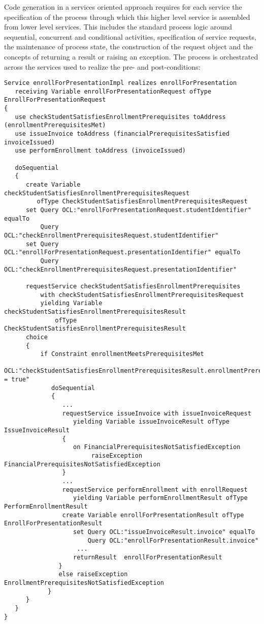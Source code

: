 Code generation in a services oriented approach requires for each service the specification of the process through which this higher level service is assembled from lower level services. This includes the standard process logic around sequential, concurrent and conditional activities, specification of service requests, the maintenance of process state, the construction of the request object and the concepts of returning a result or raising an exception. The process is orchestrated across the services used to realize the pre- and post-conditions:
\tiny{\begin{verbatim}
Service enrollForPresentationImpl realizes enrollForPresentation 
   receiving Variable enrollForPresentationRequest ofType EnrollForPresentationRequest
{
   use checkStudentSatisfiesEnrollmentPrerequisites toAddress (enrollmentPrerequisitesMet)
   use issueInvoice toAddress (financialPrerequisitesSatisfied invoiceIssued) 
   use performEnrollment toAddress (invoiceIssued)
   
   doSequential
   {
      create Variable checkStudentSatisfiesEnrollmentPrerequisitesRequest 
         ofType CheckStudentSatisfiesEnrollmentPrerequisitesRequest               
      set Query OCL:"enrollForPresentationRequest.studentIdentifier" equalTo 
          Query OCL:"checkEnrollmentPrerequisitesRequest.studentIdentifier"
      set Query OCL:"enrollForPresentationRequest.presentationIdentifier" equalTo
          Query OCL:"checkEnrollmentPrerequisitesRequest.presentationIdentifier"
                     
      requestService checkStudentSatisfiesEnrollmentPrerequisites 
          with checkStudentSatisfiesEnrollmentPrerequisitesRequest 
          yielding Variable checkStudentSatisfiesEnrollmentPrerequisitesResult
              ofType CheckStudentSatisfiesEnrollmentPrerequisitesResult
      choice
      {
          if Constraint enrollmentMeetsPrerequisitesMet 
                OCL:"checkStudentSatisfiesEnrollmentPrerequisitesResult.enrollmentPrerequisitesMet = true"
             doSequential
             {
                ...
                requestService issueInvoice with issueInvoiceRequest 
                   yielding Variable issueInvoiceResult ofType IssueInvoiceResult
                {
                   on FinancialPrerequisitesNotSatisfiedException 
                        raiseException FinancialPrerequisitesNotSatisfiedException
                }
				...
                requestService performEnrollment with enrollRequest 
                   yielding Variable performEnrollmentResult ofType PerformEnrollmentResult
                create Variable enrollForPresentationResult ofType EnrollForPresentationResult
                   set Query OCL:"issueInvoiceResult.invoice" equalTo
                       Query OCL:"enrollForPresentationResult.invoice"
     				...                       
                   returnResult  enrollForPresentationResult
               }
               else raiseException EnrollmentPrerequisitesNotSatisfiedException
            }
      }
   }         
}           
\end{verbatim}}
